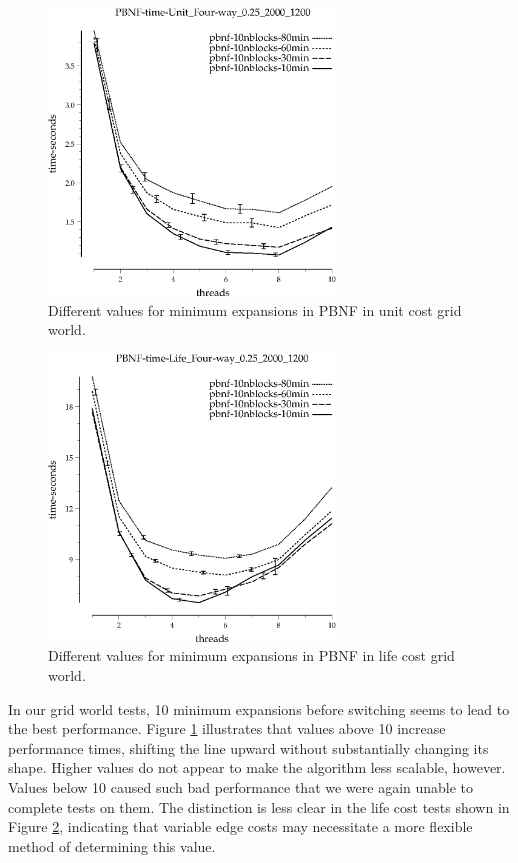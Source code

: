 \documentclass{article}
\begin{document}
\begin{figure}[h!]
\includegraphics[width=3in]{../graphs/grid_unit_four-way_0.25_2000_1200/PBNF-time-Unit_Four-way_0.25_2000_1200.eps}
\caption{Different values for minimum expansions in PBNF in unit cost grid world.}
\label{fig:PBNF-min-grid}
\end{figure}

\begin{figure}[h!]
\includegraphics[width=3in]{../graphs/grid_life_four-way_0.25_2000_1200/PBNF-time-Life_Four-way_0.25_2000_1200.eps}
\caption{Different values for minimum expansions in PBNF in life cost grid world.}
\label{fig:PBNF-min-life}
\end{figure}

In our grid world tests, 10 minimum expansions before switching seems to lead to the best performance. Figure \ref{fig:PBNF-min-grid} illustrates that values above 10 increase performance times, shifting the line upward without substantially changing its shape. Higher values do not appear to make the algorithm less scalable, however. Values below 10 caused such bad performance that we were again unable to complete tests on them. The distinction is less clear in the life cost tests shown in Figure \ref{fig:PBNF-min-life}, indicating that variable edge costs may necessitate a more flexible method of determining this value.
\end{document}
